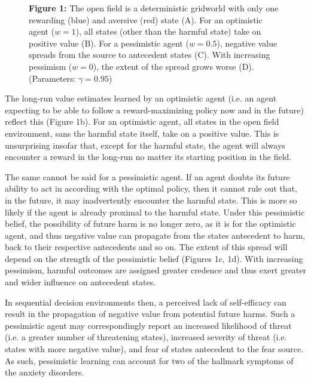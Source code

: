 \documentclass[11pt]{article} %
\begin{document}
\begin{figure}
  \centerline{%
  }
  \par \textbf{Figure 1:} The open field is a deterministic gridworld with only one rewarding (blue) and aversive (red) state (A). For an optimistic agent ($w=1$), all states (other than the harmful state) take on positive value (B). For a pessimistic agent ($w=0.5$), negative value spreads from the source to antecedent states (C). With increasing pessimism ($w=0$), the extent of the spread grows worse (D). (Parameters: $\gamma = 0.95$)
\end{figure}

The long-run value estimates learned by an optimistic agent (i.e. an agent expecting to be able to follow a reward-maximizing policy now and in the future) reflect this (Figure 1b). For an optimistic agent, all states in the open field environment, sans the harmful state itself, take on a positive value. This is unsurprising insofar that, except for the harmful state, the agent will always encounter a reward in the long-run no matter its starting position in the field.

The same cannot be said for a pessimistic agent. If an agent doubts its future ability to act in according with the optimal policy, then it cannot rule out that, in the future, it may inadvertently encounter the harmful state. This is more so likely if the agent is already proximal to the harmful state. Under this pessimistic belief, the possibility of future harm is no longer zero, as it is for the optimistic agent, and thus negative value can propagate from the states antecedent to harm, back to their respective antecedents and so on. The extent of this spread will depend on the strength of the pessimistic belief (Figures 1c, 1d). With increasing pessimism, harmful outcomes are assigned greater credence and thus exert greater and wider influence on antecedent states.

In sequential decision environments then, a perceived lack of self-efficacy can result in the propagation of negative value from potential future harms. Such a pessimistic agent may correspondingly report an increased likelihood of threat (i.e. a greater number of threatening states), increased severity of threat (i.e. states with more negative value), and fear of states antecedent to the fear source. As such, pessimistic learning can account for two of the hallmark symptoms of the anxiety disorders.
\end{document}
